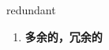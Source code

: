 
\begin{frame}
{\huge redundant}
\begin{center}
\begin{enumerate}\Large
  \item \textbf{多余的，冗余的}
\end{enumerate}
\end{center}
\end{frame}
